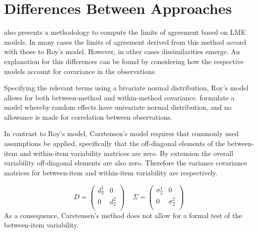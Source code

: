 \documentclass[12pt, a4paper]{report}
\theoremstyle{plain}
\theoremstyle{definition}
\theoremstyle{remark}
\begin{document}
\section{Differences Between Approaches}

\citet{BXC2008} also presents a methodology to compute the limits of agreement based on LME models. In many cases the limits of agreement derived from this method accord with those to Roy's model. However, in other cases dissimilarities emerge. An explanation for this differences can be found by considering how the respective models account for covariance in the observations. 

Specifying the relevant terms using a bivariate normal distribution, Roy's model allows for both between-method and within-method covariance. \citet{BXC2008} formulate a model whereby random effects have univariate normal distribution, and no allowance is made for correlation between observations.

In contrast to Roy's model, Carstensen's model requires that commonly used assumptions be applied, specifically that the off-diagonal elements of the between-item and within-item variability matrices are zero. By
extension the overall variability off-diagonal elements are also zero. Therefore the variance covariance matrices for
between-item and within-item variability are respectively.

\[{D} = \left(
\begin{array}{cc}
d^1_2  & 0 \\
0 & d^2_2 \\
\end{array}
\right) \;\;\;\; {\Sigma} = \left(
\begin{array}{cc}
\sigma^1_2  & 0 \\
0 & \sigma^2_2 \\
\end{array}
\right) \]
As a consequence, Carstensen's method does not allow for a formal test of the between-item variability.


\end{document}
